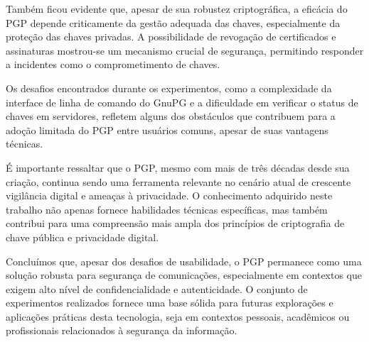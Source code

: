 Também ficou evidente que, apesar de sua robustez criptográfica, a eficácia do PGP depende criticamente da gestão adequada das chaves, especialmente da proteção das chaves privadas. A possibilidade de revogação de certificados e assinaturas mostrou-se um mecanismo crucial de segurança, permitindo responder a incidentes como o comprometimento de chaves.

Os desafios encontrados durante os experimentos, como a complexidade da interface de linha de comando do GnuPG e a dificuldade em verificar o status de chaves em servidores, refletem alguns dos obstáculos que contribuem para a adoção limitada do PGP entre usuários comuns, apesar de suas vantagens técnicas.

É importante ressaltar que o PGP, mesmo com mais de três décadas desde sua criação, continua sendo uma ferramenta relevante no cenário atual de crescente vigilância digital e ameaças à privacidade. O conhecimento adquirido neste trabalho não apenas fornece habilidades técnicas específicas, mas também contribui para uma compreensão mais ampla dos princípios de criptografia de chave pública e privacidade digital.

Concluímos que, apesar dos desafios de usabilidade, o PGP permanece como uma solução robusta para segurança de comunicações, especialmente em contextos que exigem alto nível de confidencialidade e autenticidade. O conjunto de experimentos realizados fornece uma base sólida para futuras explorações e aplicações práticas desta tecnologia, seja em contextos pessoais, acadêmicos ou profissionais relacionados à segurança da informação.